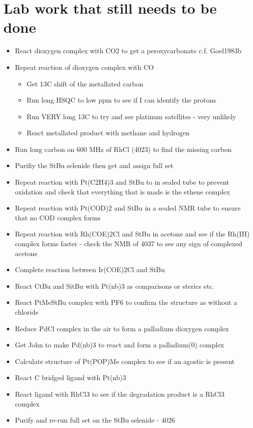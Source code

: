 \section{Lab work that still needs to be done}
\begin{itemize}
\item{React dioxygen complex with CO2 to get a peroxycarbonate c.f. Goel1983b}
\item{Repeat reaction of dioxygen complex with CO}
	\begin{itemize}
	\item{Get 13C shift of the metallated carbon}
	\item{Run long HSQC to low ppm to see if I can identify the protons}
	\item{Run VERY long 13C to try and see platinum satellites - very unlikely}
	\item{React metallated product with methane and hydrogen}
	\end{itemize}
\item{Run long carbon on 600 MHz of RhCl (4023) to find the missing carbon}
\item{Purifiy the StBu selenide then get and assign full set}
\item{Repeat reaction with Pt(C2H4)3 and StBu to in sealed tube to prevent oxidation and check that everything that is made is the ethene complex}
\item{Repeat reaction with Pt(COD)2 and StBu in a sealed NMR tube to ensure that no COD complex forms}
\item{Repeat reaction with Rh(COE)2Cl and StBu in acetone and see if the Rh(III) complex forms faster - check the NMR of 4037 to see any sign of complexed acetone}
\item{Complete reaction between Ir(COE)2Cl and StBu}
\item{React CtBu and SitBu with Pt(nb)3 as comparisons or sterics etc.}
\item{React PtMeStBu complex with PF6 to confirm the structure as without a chloride}
\item{Reduce PdCl complex in the air to form a palladium dioxygen complex}
\item{Get John to make Pd(nb)3 to react and form a palladium(0) complex}
\item{Calculate structure of Pt(POP)Me complex to see if an agostic is present}
\item{React C bridged ligand with Pt(nb)3}
\item{React ligand with RhCl3 to see if the degradation product is a RhCl3 complex}
\item{Purify and re-run full set on the StBu selenide - 4026}
\end{itemize}

